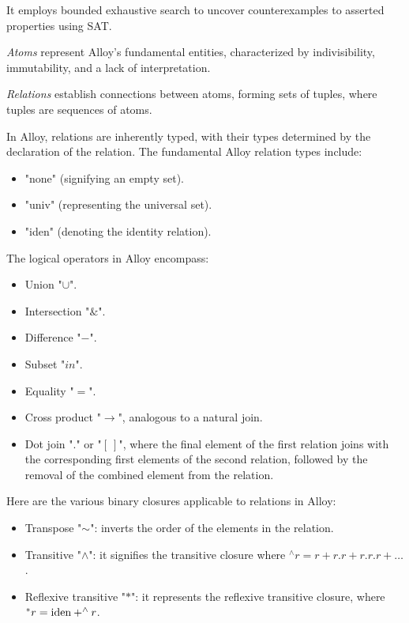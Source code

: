 \documentclass[12pt, a4paper]{report}
\begin{document}
    It employs bounded exhaustive search to uncover counterexamples to asserted properties using SAT.        
    \newpage
    \begin{definition}
            \emph{Atoms} represent Alloy's fundamental entities, characterized by indivisibility, immutability, and a lack of interpretation.

            \emph{Relations} establish connections between atoms, forming sets of tuples, where tuples are sequences of atoms.
        \end{definition}
        In Alloy, relations are inherently typed, with their types determined by the declaration of the relation. 
        The fundamental Alloy relation types include:
        \begin{itemize}
            \item "none" (signifying an empty set). 
            \item "univ" (representing the universal set).
            \item "iden" (denoting the identity relation).
        \end{itemize}
        The logical operators in Alloy encompass:
        \begin{itemize}
            \item Union "$\cup$".
            \item Intersection "$\&$".
            \item Difference "$-$".
            \item Subset "$in$".
            \item Equality "$=$".
            \item Cross product "$\rightarrow$", analogous to a natural join.
            \item Dot join "$.$" or "$[\:]$", where the final element of the first relation joins with the corresponding first elements of the second relation, followed by the removal of the combined element from the relation.
        \end{itemize}
        Here are the various binary closures applicable to relations in Alloy:
        \begin{itemize}
            \item Transpose "$\sim$": inverts the order of the elements in the relation.
            \item Transitive "$\land$": it signifies the transitive closure where $^{\land}r=r+r.r+r.r.r+\dots$. 
            \item Reflexive transitive "$*$": it represents the reflexive transitive closure, where $^{*}r=\textnormal{iden}+^{\land}r$. 
        \end{itemize}
\end{document}
